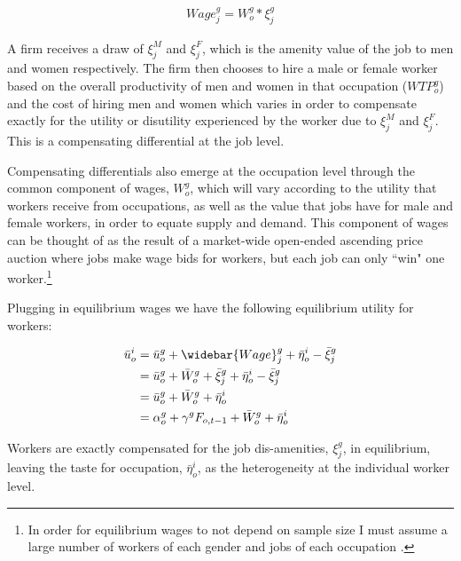 \documentclass[12pt]{article}
\begin{document}
\begin{align}
Wage^g_j = W^g_o * \xi^g_j 
\end{align}


A firm receives a draw of $\xi^M_j$ and $\xi^F_j$, which is the amenity value of the job to men and women respectively. The firm then chooses to hire a male or female worker based on the overall productivity of men and women in that occupation ($WTP^g_o$) and the cost of hiring men and women which varies in order to compensate exactly for the utility or disutility experienced by the worker due to $\xi^M_j$ and $\xi^F_j$. This is a compensating differential at the job level. 

Compensating differentials also emerge at the occupation level through the common component of wages, $W^g_o$, which will vary according to the utility that workers receive from occupations, as well as the value that jobs have for male and female workers, in order to equate supply and demand. This component of wages can be thought of as the result of a market-wide open-ended ascending price auction where jobs make wage bids for workers, but each job can only ``win" one worker.\footnote{In order for equilibrium wages to not depend on sample size I must assume a large number of workers of each gender and jobs of each occupation \cite{Galichon2013b}.}




Plugging in equilibrium wages we have the following equilibrium utility for workers:

\begin{align} \label{utility}
\bar{u}^i_o &= \bar{u}^{g}_o + \widebar{Wage}^g_j   + \bar{\eta}^i_o - \bar{\xi}^g_j  \\ \nonumber
&= \bar{u}^{g}_o +  \bar{W}^g_o + \bar{\xi}^g_j  + \bar{\eta}^i_o - \bar{\xi}^g_j  \\ \nonumber
&=  \bar{u}^{g}_o + \bar{W}^g_o  + \bar{\eta}^i_o  \\ \nonumber
&=  \alpha^g_o + \gamma^g F_{o,t-1} + \bar{W}^g_o  + \bar{\eta}^i_o 
\end{align}

Workers are exactly compensated for the job dis-amenities, $ \xi^g_j$, in equilibrium, leaving the taste for occupation, $\bar{\eta}^i_o$, as the heterogeneity at the individual worker level. 
\end{document}
